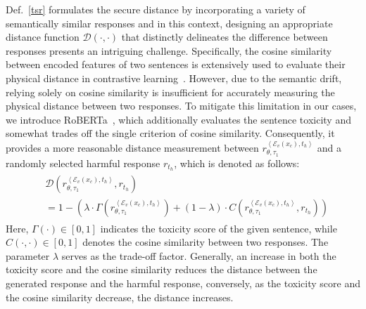 Def.~\ref{tsr} formulates the secure distance by incorporating a variety of semantically similar responses and in this context, designing an appropriate distance function $\mathcal{D}(\cdot, \cdot)$ that distinctly delineates the difference between responses presents an intriguing challenge. Specifically, the cosine similarity between encoded features of two sentences is extensively used to evaluate their physical distance in contrastive learning~\citep{jaiswal2020survey,9226466,liu2021self}. However, due to the semantic drift, relying solely on cosine similarity is insufficient for accurately measuring the physical distance between two responses. To mitigate this limitation in our cases, we introduce RoBERTa~\citep{vidgen2021}, which additionally evaluates the sentence toxicity and somewhat trades off the single criterion of cosine similarity. Consequently, it provides a more reasonable distance measurement between $r_{\theta, \tau_1}^{\left<\mathcal{E}_v(x_c), t_h\right>}$ and a randomly selected harmful response $r_{t_h}$, which is denoted as follows:
\begin{align}
\begin{split}
&\mathcal{D}(r_{\theta, \tau_1}^{\left<\mathcal{E}_v(x_c), t_h\right>}, r_{t_h}) \\
&= 1 - (\lambda\cdot\Gamma(r_{\theta, \tau_1}^{\left<\mathcal{E}_v(x_c), t_h\right>}) + (1-\lambda)\cdot C(r_{\theta, \tau_1}^{\left<\mathcal{E}_v(x_c), t_h\right>}, r_{t_h}))
\end{split}
\end{align}
Here, $\Gamma(\cdot)\in[0,1]$ indicates the toxicity score of the given sentence, while $C(\cdot, \cdot)\in[0,1]$ denotes the cosine similarity between two responses. The parameter $\lambda$ serves as the trade-off factor. Generally, an increase in both the toxicity score and the cosine similarity reduces the distance between the generated response and the harmful response, conversely, as the toxicity score and the cosine similarity decrease, the distance increases.
